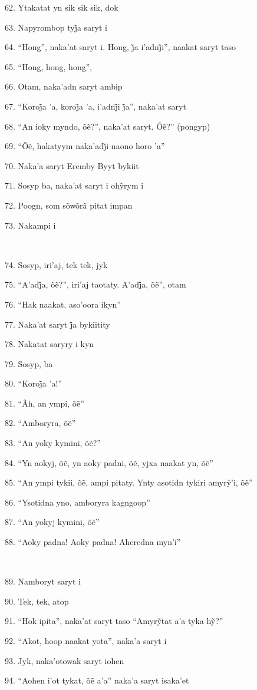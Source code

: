 62. Ytakatat yn sik sik sik, dok

63. Napyrombop tyj̃a saryt i

64. “Hong”, naka’at saryt i. Hong, j̃a i’adnj̃i”, naakat saryt taso

65. ``Hong, hong, hong'',

66. Otam, naka'adn saryt ambip

67. “Koroj̃a ’a, koroj̃a ’a, i’adnj̃i j̃a”, naka’at saryt

68. “An ioky myndo, õẽ?”, naka’at saryt. Õẽ?” (pongyp)

69. “Õẽ, hakatyym naka’adj̃i naono horo ’a”

70. Naka'a saryt Eremby Byyt bykiit

71. Sosyp ba, naka’at saryt i ohỹrym i

72. Poogn, som sõwõrã pitat impan

73. Nakampi i

~

74. Sosyp, iri'aj, tek tek, jyk

75. “A’adj̃a, õẽ?”, iri’aj taotaty. A’adj̃a, õẽ”, otam

76. ``Hak naakat, aso'oora ikyn''

77. Naka’at saryt j̃a bykiitity

78. Nakatat saryry i kyn

79. Sosyp, ba

80. “Koroj̃a ’a!”

81. “Ãh, an ympi, õẽ”

82. “Amboryra, õẽ”

83. “An yoky kymini, õẽ?”

84. “Yn aokyj, õẽ, yn aoky padni, õẽ, yjxa naakat yn, õẽ”

85. “An ympi tykii, õẽ, ampi pitaty. Ynty asotidn tykiri amyrỹ’i, õẽ”

86. ``Ysotidna yno, amboryra kagngoop''

87. “An yokyj kymini, õẽ”

88. ``Aoky padna! Aoky padna! Aheredna myn'i''

~

89. Namboryt saryt i

90. Tek, tek, atop

91. “Hok ipita”, naka’at saryt taso “Amyrỹtat a’a tyka hỹ?”

92. ``Akot, hoop naakat yota'', naka'a saryt i

93. Jyk, naka'otowak saryt iohen

94. “Aohen i’ot tykat, õẽ a’a” naka’a saryt isaka’et

